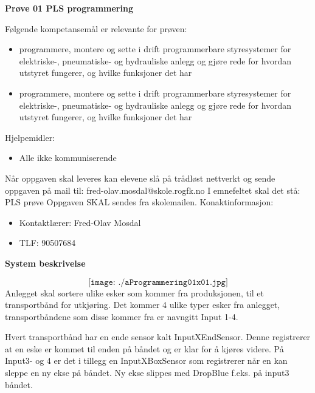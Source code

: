 

\begin{centering}
\Huge{\textbf{Prøve 01 PLS programmering}}\\
\end{centering}
\vskip 2cm 
Følgende kompetansemål er relevante for prøven:
\begin{itemize}[noitemsep]


	\item programmere, montere og sette i drift programmerbare styresystemer for elektriske-, pneumatiske- og hydrauliske anlegg og gjøre rede for hvordan utstyret fungerer, og hvilke funksjoner det har

	\item programmere, montere og sette i drift programmerbare styresystemer for elektriske-, pneumatiske- og hydrauliske anlegg og gjøre rede for hvordan utstyret fungerer, og hvilke funksjoner det har
\end{itemize}
\vskip 2.5pt 
Hjelpemidler:\begin{itemize}[noitemsep]
	\item Alle ikke kommuniserende
\end{itemize}

\vskip 5pt 
\vskip 10pt 
\vskip 2.5pt 
\vskip 2.5pt 
Når oppgaven skal leveres kan elevene slå på trådløst nettverkt og sende oppgaven på mail til:
\vskip 2.5pt 
fred-olav.mosdal@skole.rogfk.no
\vskip 2.5pt 
I emnefeltet skal det stå: PLS prøve
\vskip 2.5pt
Oppgaven SKAL sendes fra skolemailen. 
\vskip 2cm   
Konaktinformasjon:
\begin{itemize}[noitemsep]
	\item Kontaktlærer: Fred-Olav Mosdal
	\item TLF: 90507684
\end{itemize}
\vfil\eject
\textbf{System beskrivelse}

$$\texttt{[image: ./aProgrammering01x01.jpg]}$$
Anlegget skal sortere ulike esker som kommer fra produksjonen, til et transportbånd for utkjøring. Det kommer 4 ulike typer esker fra anlegget, transportbåndene som disse kommer fra er navngitt Input 1-4. 

\vskip 5pt 
Hvert transportbånd har en ende sensor kalt InputXEndSensor. Denne registrerer at en eske er kommet til enden på båndet og er klar for å kjøres videre. På Input3- og 4 er det i tillegg en InputXBoxSensor som registrerer når en kan sleppe en ny ekse på båndet. Ny ekse slippes med DropBlue f.eks. på input3 båndet. 


